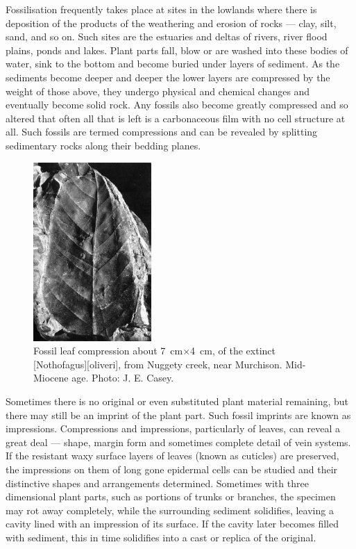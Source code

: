 Fossilisation frequently takes place at sites in the lowlands where there is deposition of the products of the weathering and erosion of rocks --- clay, silt, sand, and so on.
Such sites are the estuaries and deltas of rivers, river flood plains, ponds and lakes.
Plant parts fall, blow or are washed into these bodies of water, sink to the bottom and become buried under layers of sediment.
As the sediments become deeper and deeper the lower layers are compressed by the weight of those above, they undergo physical and chemical changes and eventually become solid rock.
Any fossils also become greatly compressed and so altered that often all that is left is a carbonaceous film with no cell structure at all.
Such fossils are termed compressions and can be revealed by splitting sedimentary rocks along their bedding planes.
\begin{figure}
	\includegraphics[width=0.4\textwidth]{graphics/figure121fossil-leaf.jpg}
	\centering
	\caption[Fossil leaf compression]{Fossil leaf compression about \SI{7}{\centi\metre}$\times$\SI{4}{\centi\metre}, of the extinct [Nothofagus][oliveri], from Nuggety creek, near Murchison.
	Mid-Miocene age.
	Photo: J. E. Casey.}%
	\label{fig:121fossil-leaf}
\end{figure}
Sometimes there is no original or even substituted plant material remaining, but there may still be an imprint of the plant part.
Such fossil imprints are known as impressions.
Compressions and impressions, particularly of leaves, can reveal a great deal --- shape, margin form and sometimes complete detail of vein systems.
If the resistant waxy surface layers of leaves (known as cuticles) are preserved, the impressions on them of long gone epidermal cells can be studied and their distinctive shapes and arrangements determined.
Sometimes with three dimensional plant parts, such as portions of trunks or branches, the specimen may rot away completely, while the surrounding sediment solidifies, leaving a cavity lined with an impression of its surface.
If the cavity later becomes filled with sediment, this in time solidifies into a cast or replica of the original.

